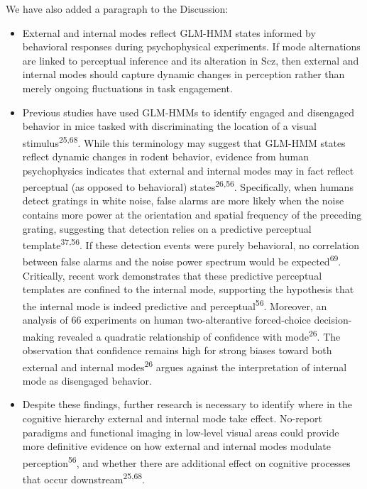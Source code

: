 \documentclass[
]{article}
\begin{document}
We have also added a paragraph to the Discussion:

\begin{itemize}
\item
  External and internal modes reflect GLM-HMM states informed by
  behavioral responses during psychophysical experiments. If mode
  alternations are linked to perceptual inference and its alteration in
  Scz, then external and internal modes should capture dynamic changes
  in perception rather than merely ongoing fluctuations in task
  engagement.
\item
  Previous studies have used GLM-HMMs to identify engaged and disengaged
  behavior in mice tasked with discriminating the location of a visual
  stimulus\textsuperscript{25,68}. While this terminology may suggest
  that GLM-HMM states reflect dynamic changes in rodent behavior,
  evidence from human psychophysics indicates that external and internal
  modes may in fact reflect perceptual (as opposed to behavioral)
  states\textsuperscript{26,56}. Specifically, when humans detect
  gratings in white noise, false alarms are more likely when the noise
  contains more power at the orientation and spatial frequency of the
  preceding grating, suggesting that detection relies on a predictive
  perceptual template\textsuperscript{37,56}. If these detection events
  were purely behavioral, no correlation between false alarms and the
  noise power spectrum would be expected\textsuperscript{69}.
  Critically, recent work demonstrates that these predictive perceptual
  templates are confined to the internal mode, supporting the hypothesis
  that the internal mode is indeed predictive and
  perceptual\textsuperscript{56}. Moreover, an analysis of 66
  experiments on human two-alterantive forced-choice decision-making
  revealed a quadratic relationship of confidence with
  mode\textsuperscript{26}. The observation that confidence remains high
  for strong biases toward both external and internal
  modes\textsuperscript{26} argues against the interpretation of
  internal mode as disengaged behavior.
\item
  Despite these findings, further research is necessary to identify
  where in the cognitive hierarchy external and internal mode take
  effect. No-report paradigms and functional imaging in low-level visual
  areas could provide more definitive evidence on how external and
  internal modes modulate perception\textsuperscript{56}, and whether
  there are additional effect on cognitive processes that occur
  downstream\textsuperscript{25,68}.
\end{itemize}
\end{document}
